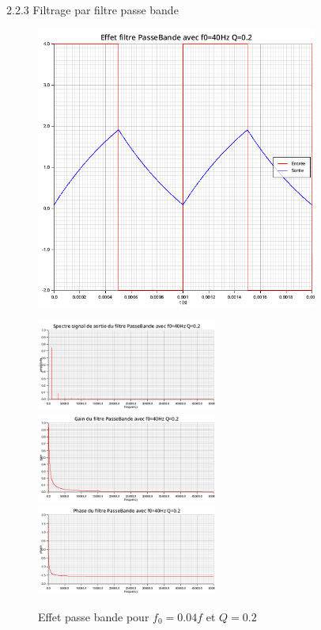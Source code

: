 \documentclass{article}
\newcommand{\expart}[1]
{
    \begin{largeUnderline}#1\end{largeUnderline}\par
}
\begin{document}
\pagebreak

\expart{2.2.3 Filtrage par filtre passe bande}

\begin{figure}[H]
  \begin{minipage}{0.6\textwidth}
      \centering
      \includegraphics[width=25em]{images/creneau/bande/q=0.2/0.04/signals.png}
  \end{minipage}
  \begin{minipage}{0.3\textwidth}
      \centering
      \includegraphics[width=16em]{images/creneau/bande/q=0.2/0.04/fft_out.png}
      \vfill
      \includegraphics[width=16em]{images/creneau/bande/q=0.2/0.04/gain.png}
      \vfill
      \includegraphics[width=16em]{images/creneau/bande/q=0.2/0.04/phase.png}
  \end{minipage}
  \caption{Effet passe bande pour $f_0=0.04f$ et $Q=0.2$}
\end{figure}
\end{document}
